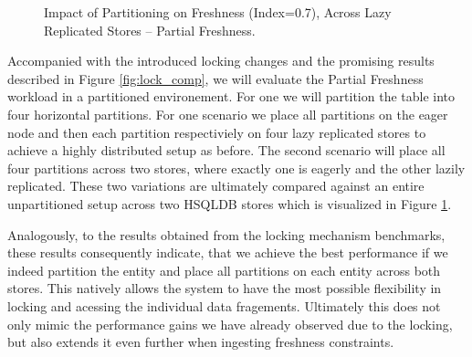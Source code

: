 \begin{figure}[t] 
    \centering 
    \caption{Impact of Partitioning on Freshness (Index=0.7), Across Lazy Replicated Stores -- Partial Freshness.}
    \label{fig:partition_result}
\end{figure}

Accompanied with the introduced locking changes and the promising results described in Figure \ref{fig:lock_comp}, we will evaluate the Partial Freshness workload in 
a partitioned environement. For one we will partition the table into four horizontal partitions. 
For one scenario we place all partitions on the eager node and then each partition respectiviely on four lazy replicated stores to achieve a highly distributed setup as before.
The second scenario will place all four partitions across two stores, where exactly one is eagerly and the other lazily replicated. 
These two variations are ultimately compared against an entire unpartitioned setup across two HSQLDB stores which is visualized in Figure \ref{fig:partition_result}.


Analogously, to the results obtained from the locking mechanism benchmarks, 
these results consequently indicate, that we achieve the best performance
if we indeed partition the entity and place all partitions on each entity across both stores. This natively allows the system to have the most possible 
flexibility in locking and acessing the individual data fragements. 
Ultimately this does not only mimic the performance gains we have already observed due to the locking, 
but also extends it even further when ingesting freshness constraints.\\





